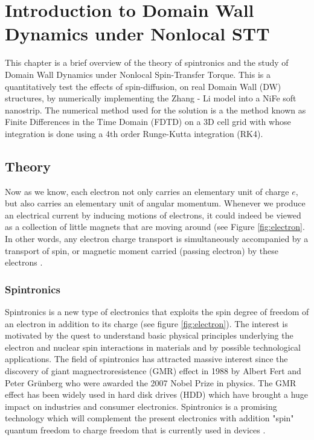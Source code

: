 
\chapter{Introduction to Domain Wall Dynamics under Nonlocal STT} %

\label{Introduction to Domain Wall Dynamics under Nonlocal STT} %



This chapter is a brief overview of the theory of spintronics and the study of Domain Wall Dynamics under Nonlocal Spin-Transfer Torque. This is a quantitatively test the effects of spin-diffusion, on real Domain Wall (DW) structures, by numerically implementing the Zhang - Li model into a NiFe soft nanostrip. The numerical method used for the solution is a the method known as Finite Differences in the Time Domain (FDTD) on a 3D cell grid with whose integration is done using a 4th order Runge-Kutta integration (RK4).

\section{Theory}

Now as we know, each electron not only carries an elementary
unit of charge $e$, but also carries an elementary unit of angular momentum. Whenever we produce an electrical current by inducing
motions of electrons, it could indeed be viewed as a collection of little magnets that are moving around (see Figure \ref{fig:electron}. In other words, any electron charge transport is simultaneously accompanied by a transport of spin, or magnetic moment carried (passing electron) by these electrons \cite{cornell}.

\subsection{Spintronics}

Spintronics is a new type of electronics that exploits the spin degree of freedom of an electron in addition to its charge \cite{spinz} (see figure \ref{fig:electron}). The interest is motivated by the quest to understand basic physical principles underlying the electron and nuclear spin interactions in materials and by possible technological applications. The field of spintronics has attracted massive interest since the discovery of giant magnectroresistence (GMR) effect in 1988 by Albert Fert and Peter Gr\"{u}nberg who were awarded the 2007 Nobel Prize in physics. The GMR effect has been widely used in hard disk drives (HDD) which have brought a huge impact on industries and consumer electronics. Spintronics is a promising technology which will complement the present electronics with addition "spin" quantum freedom to charge freedom that is currently used in devices \cite{nonlocalspin}.

